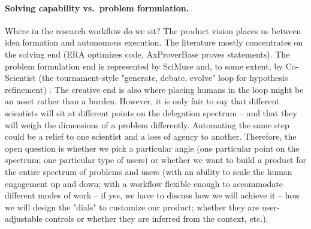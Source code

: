 \paragraph{Solving capability vs.\ problem formulation.}
Where in the research workflow do we sit? The product vision places us between idea formation and autonomous execution. The literature mostly concentrates on the solving end (ERA optimizes code, AxProverBase proves statements). The problem formulation end is represented by SciMuse \cite{2405.17044} and, to some extent, by Co-Scientist (the tournament-style "generate, debate, evolve" loop for hypothesis refinement) \cite{Gottweis2026}. The creative end is also where placing humans in the loop might be an asset rather than a burden. However, it is only fair to say that different scientists will sit at different points on the delegation spectrum -- and that they will weigh the dimensions of a problem differently.
Automating the same step could be a relief to one scientist and a loss of agency to another. 
Therefore, the open question is whether we pick a particular angle (one particular point on the spectrum; one particular type of users) or whether we want to build a product for the entire spectrum of problems and users (with an ability to scale the human engagement up and down; with a workflow flexible enough to accommodate different modes of work -- if yes, we have to discuss how we will achieve it -- how we will design the "dials" to customize our product; whether they are user-adjustable controls or whether they are inferred from the context, etc.).

